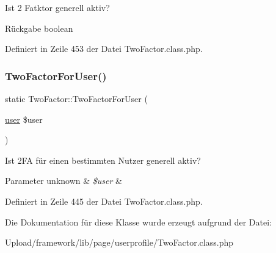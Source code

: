Ist 2 Fatktor generell aktiv? \begin{DoxyReturn}{Rückgabe}
boolean 
\end{DoxyReturn}


Definiert in Zeile 453 der Datei Two\+Factor.\+class.\+php.

\mbox{\label{class_two_factor_a504f0bf8fd9701621f2542bfc02468c2}} 
\subsubsection{\texorpdfstring{Two\+Factor\+For\+User()}{TwoFactorForUser()}}
{\footnotesize\ttfamily static Two\+Factor\+::\+Two\+Factor\+For\+User (\begin{DoxyParamCaption}\item[{\mbox{\hyperlink{classuser}{user}}}]{\$user }\end{DoxyParamCaption})\hspace{0.3cm}{\ttfamily [static]}}

Ist 2\+FA für einen bestimmten Nutzer generell aktiv? 
\begin{DoxyParams}[1]{Parameter}
unknown & {\em \$user} & \\
\hline
\end{DoxyParams}


Definiert in Zeile 445 der Datei Two\+Factor.\+class.\+php.



Die Dokumentation für diese Klasse wurde erzeugt aufgrund der Datei\+:\begin{DoxyCompactItemize}
\item 
Upload/framework/lib/page/userprofile/Two\+Factor.\+class.\+php\end{DoxyCompactItemize}
